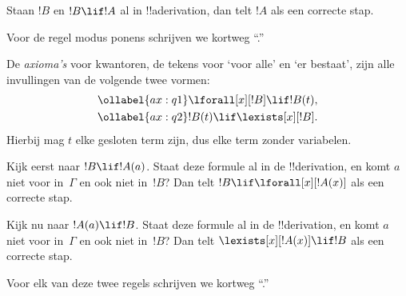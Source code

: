 \documentclass[openany]{memoir}
\begin{document}
\begin{defn}
  Staan $!B$ en $!B \lif !A$ al in !!a{derivation}, dan telt $!A$ als
  een correcte stap.
\end{defn}

Voor de regel modus ponens schrijven we kortweg ``\MP.''
\endgroup

\begingroup
\def\olfilename{OLP-0115}
\def\olfilepath{content/first-order-logic/axiomatic-deduction/}
\hypertarget{unit-OLP-0115}{}





\begin{defn}
De \emph{axioma's} voor kwantoren, de tekens voor `voor alle' en `er
bestaat', zijn alle invullingen van de volgende twee vormen:
\begin{align}
\ollabel{ax:q1} & \lforall[x][!B] \lif !B(t), \\
\ollabel{ax:q2} & !B(t) \lif \lexists[x][!B].
\end{align}
Hierbij mag $t$ elke gesloten term zijn, dus elke term zonder
variabelen.
\end{defn}

\begin{defn}
\item Kijk eerst naar $!B \lif !A(a)$. Staat deze formule al in de
  !!{derivation}, en komt $a$ niet voor in~$\Gamma$ en ook niet in~$!B$? Dan
  telt $!B \lif \lforall[x][!A(x)]$ als een correcte stap.
\item Kijk nu naar $!A(a) \lif !B$. Staat deze formule al in de
  !!{derivation}, en komt $a$ niet voor in~$\Gamma$ en ook niet in~$!B$? Dan
  telt $\lexists[x][!A(x)] \lif !B$ als een correcte stap.
\end{defn}

Voor elk van deze twee regels schrijven we kortweg ``\QR.''
\endgroup
\end{document}
